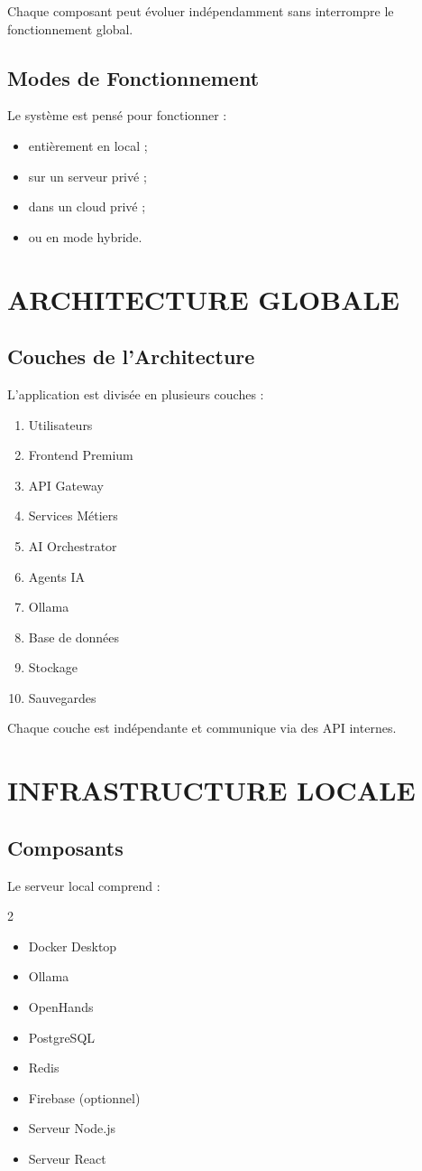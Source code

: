 \documentclass[12pt,a4paper,oneside]{book}
\begin{document}
Chaque composant peut évoluer indépendamment sans interrompre le fonctionnement global.

\section{Modes de Fonctionnement}
Le système est pensé pour fonctionner :
\begin{itemize}
\item entièrement en local ;
\item sur un serveur privé ;
\item dans un cloud privé ;
\item ou en mode hybride.
\end{itemize}

\chapter{ARCHITECTURE GLOBALE}

\section{Couches de l'Architecture}
L'application est divisée en plusieurs couches :

\begin{enumerate}
\item Utilisateurs
\item Frontend Premium
\item API Gateway
\item Services Métiers
\item AI Orchestrator
\item Agents IA
\item Ollama
\item Base de données
\item Stockage
\item Sauvegardes
\end{enumerate}

Chaque couche est indépendante et communique via des API internes.

\chapter{INFRASTRUCTURE LOCALE}

\section{Composants}
Le serveur local comprend :
\begin{multicols}{2}
\begin{itemize}
\item Docker Desktop
\item Ollama
\item OpenHands
\item PostgreSQL
\item Redis
\item Firebase (optionnel)
\item Serveur Node.js
\item Serveur React
\end{itemize}
\end{multicols}
\end{document}
